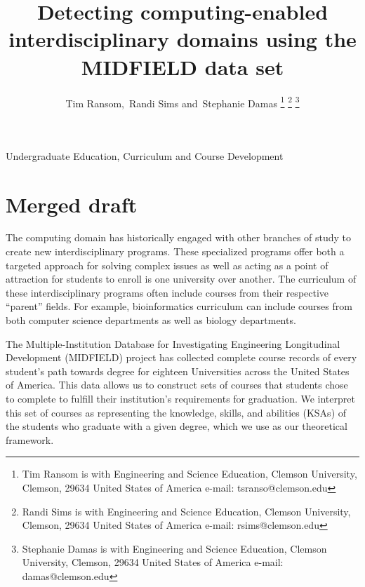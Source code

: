 \documentclass[
  journal,
]{IEEEtran}%
\title{Detecting computing-enabled interdisciplinary domains using the
MIDFIELD data set}
\author{
Tim Ransom\orcidlink{0000-0003-0357-5427},~Randi
Sims\orcidlink{0000-0003-0357-5427}
and~Stephanie Damas\orcidlink{0000-0001-5397-7577}%
\thanks{Tim Ransom is with Engineering and Science Education, Clemson
University, Clemson, 29634 United States of America%
 e-mail: tsranso@clemson.edu}
\thanks{Randi Sims is with Engineering and Science Education, Clemson
University, Clemson, 29634 United States of America%
 e-mail: rsims@clemson.edu}
\thanks{Stephanie Damas is with Engineering and Science
Education, Clemson University, Clemson, 29634 United States of America%
 e-mail: damas@clemson.edu}
}
\begin{document}


\maketitle

\begin{IEEEkeywords}
Undergraduate Education, Curriculum and Course Development
\end{IEEEkeywords}

%

\ifdefined\Shaded\renewenvironment{Shaded}{\begin{tcolorbox}[sharp corners, interior hidden, breakable, boxrule=0pt, frame hidden, enhanced, borderline west={3pt}{0pt}{shadecolor}]}{\end{tcolorbox}}\fi

\hypertarget{merged-draft}{%
\section{Merged draft}\label{merged-draft}}

The computing domain has historically engaged with other branches of
study to create new interdisciplinary programs. These specialized
programs offer both a targeted approach for solving complex issues as
well as acting as a point of attraction for students to enroll is one
university over another. The curriculum of these interdisciplinary
programs often include courses from their respective ``parent'' fields.
For example, bioinformatics curriculum can include courses from both
computer science departments as well as biology departments.

The Multiple-Institution Database for Investigating Engineering
Longitudinal Development (MIDFIELD) project has collected complete
course records of every student's path towards degree for eighteen
Universities across the United States of America. This data allows us to
construct sets of courses that students chose to complete to fulfill
their institution's requirements for graduation. We interpret this set
of courses as representing the knowledge, skills, and abilities (KSAs)
of the students who graduate with a given degree, which we use as our
theoretical framework.
\end{document}
